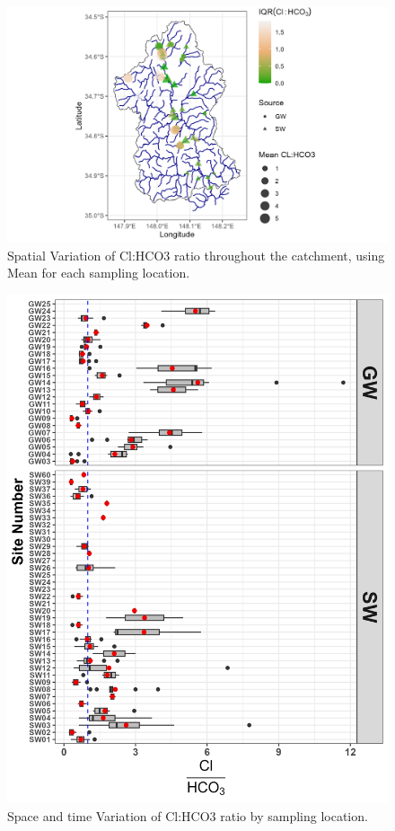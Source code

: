 \documentclass[, manuscript]{copernicus}
\begin{document}
\begin{figure}
\includegraphics[width=0.8\linewidth]{Figures/clhco3_map} \caption{Spatial Variation of Cl:HCO3 ratio throughout the catchment, using Mean for each sampling location.}\label{fig:Carbonate-map}
\end{figure}
\clearpage

\begin{figure}
\includegraphics[width=0.8\linewidth]{Figures/clhco3_plot} \caption{Space and time Variation of Cl:HCO3 ratio by sampling location.}\label{fig:Carbonate-boxplot}
\end{figure}

\clearpage
\end{document}
